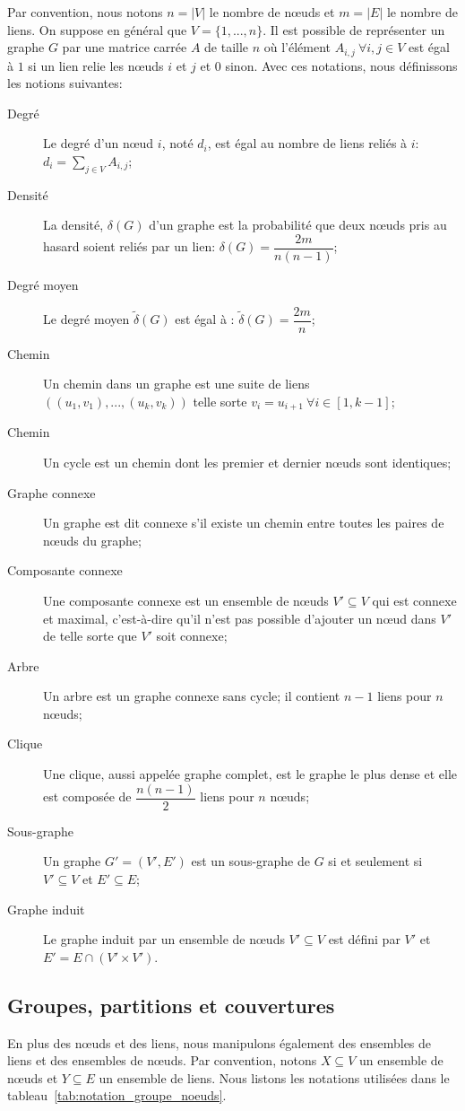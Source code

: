 Par convention, nous notons $n=|V|$ le nombre de n\oe{}uds et $m=|E|$ le nombre de liens.
On suppose en général que $V=\{1, ..., n\}$.
Il est possible de représenter un graphe $G$ par une matrice carrée $A$ de taille $n$ où l'élément $A_{i,j} \ \forall i,j \in V$ est égal à $1$ si un lien relie les n\oe{}uds $i$ et $j$ et $0$ sinon.
Avec ces notations, nous définissons les notions suivantes:
\begin{description}
\item[Degré] Le degré d'un n\oe{}ud $i$, noté $d_i$, est égal au nombre de liens reliés à $i$: $d_i = \sum_{j \in V} A_{i,j}$;
\item[Densité] La densité, $\delta(G)$ d'un graphe est la probabilité que deux n\oe{}uds pris au hasard soient reliés par un lien: $\delta(G)=\dfrac{2m}{n(n-1)}$;
\item[Degré moyen] Le degré moyen $\tilde{\delta}(G)$ est égal à : $\tilde{\delta}(G)=\dfrac{2m}{n}$;
\item[Chemin] Un chemin dans un graphe est une suite de liens $((u_1,v_1),...,(u_k,v_k))$ telle sorte $v_{i}=u_{i+1} \ \forall i \in [1,k-1]$;
\item[Chemin] Un cycle est un chemin dont les premier et dernier n\oe{}uds sont identiques;
\item[Graphe connexe] Un graphe est dit connexe s'il existe un chemin entre toutes les paires de n\oe{}uds du graphe;
\item[Composante connexe] Une composante connexe est un ensemble de n\oe{}uds $V'\subseteq V$ qui est connexe et maximal, c'est-à-dire qu'il n'est pas possible d'ajouter un n\oe{}ud dans $V'$ de telle sorte que $V'$ soit connexe;
\item[Arbre] Un arbre est un graphe connexe sans cycle; il contient $n-1$ liens pour $n$ n\oe{}uds;
\item[Clique] Une clique, aussi appelée graphe complet, est le graphe le plus dense et elle est composée de $\dfrac{n(n-1)}{2}$ liens pour $n$ n\oe{}uds;
\item[Sous-graphe] Un graphe $G'=(V',E')$ est un sous-graphe de $G$ si et seulement si $V' \subseteq V$ et $E' \subseteq E$;
\item[Graphe induit] Le graphe induit par un ensemble de n\oe{}uds $V' \subseteq V$ est défini par $V'$ et $E'= E \cap (V' \times V')$.  
\end{description}



\subsection{Groupes, partitions et couvertures}
En plus des n\oe{}uds et des liens, nous manipulons également des ensembles de liens et des ensembles de n\oe{}uds.
Par convention, notons $X \subseteq V$ un ensemble de n\oe{}uds et $Y \subseteq E$ un ensemble de liens.
Nous listons les notations utilisées dans le tableau~\ref{tab:notation_groupe_noeuds}.


